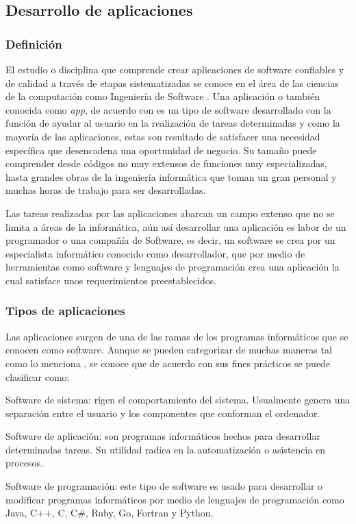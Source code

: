 \subsection{Desarrollo de aplicaciones}
\subsubsection{Definición}
El estudio o disciplina que comprende crear aplicaciones de software confiables y de calidad a través de etapas sistematizadas se conoce en el área de las ciencias de la computación como Ingeniería de Software \parencite{Sommerville2005}. Una aplicación o también conocida como \textit{app}, de acuerdo con \textcite{Pressman2002} es un tipo de software desarrollado con la función de ayudar al usuario en la realización de tareas determinadas y como la mayoría de las aplicaciones, estas son resultado de satisfacer una necesidad específica que desencadena una oportunidad de negocio. Su tamaño puede comprender desde códigos no muy extensos de funciones muy especializadas, hasta grandes obras de la ingeniería informática que toman un gran personal y muchas horas de trabajo para ser desarrolladas.

Las tareas realizadas por las aplicaciones abarcan un campo extenso que no se limita a áreas de la informática, aún así desarrollar una aplicación es labor de un programador o una compañía de Software, es decir, un software se crea por un especialista informático conocido como desarrollador, que por medio de herramientas como software y lenguajes de programación crea una aplicación la cual satisface unos requerimientos preestablecidos. 

\subsubsection{Tipos de aplicaciones}
Las aplicaciones surgen de una de las ramas de los programas informáticos que se conocen como software. Aunque se pueden categorizar de muchas maneras tal como lo menciona \parencite{Pressman2002}, se conoce que de acuerdo con sus fines prácticos se puede clasificar como:

\begin{APAitemize}
    \item Software de sistema: rigen el comportamiento del sistema. Usualmente genera una separación entre el usuario y los componentes que conforman el ordenador. 
    \item Software de aplicación: son programas informáticos hechos para desarrollar determinadas tareas. Su utilidad radica en la automatización o asistencia en procesos.
    \item Software de programación: este tipo de software es usado para desarrollar o modificar programas informáticos por medio de lenguajes de programación como Java, C++, C, C\#, Ruby, Go, Fortran y Python.
\end{APAitemize}

